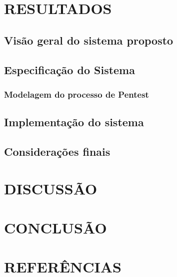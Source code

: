 \documentclass[a4paper, 12pt]{article}
\begin{document}
\section{RESULTADOS}
	\subsection{Visão geral do sistema proposto}
	\subsection{Especificação do Sistema}
	\subsubsection{Modelagem do processo de Pentest}
	\subsection{Implementação do sistema}
	\subsection{Considerações finais}

\section{DISCUSSÃO}

\section{CONCLUSÃO}

\section{REFERÊNCIAS}
\end{document}
